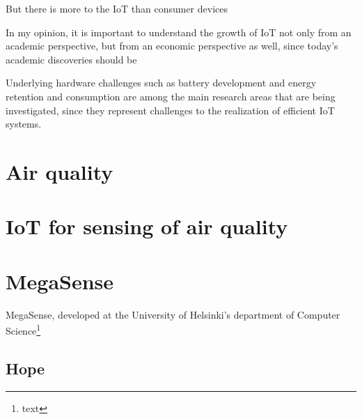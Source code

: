 		But there is more to the IoT than consumer devices
		
		In my opinion, it is important to understand the growth of IoT not only from an academic perspective, but from an economic perspective as well, since today's academic discoveries should be 
			
		Underlying hardware challenges such as battery development and energy retention and consumption are among the main research areas that are being investigated, since they represent challenges to the realization of efficient IoT systems.
		
		

\newpage
\section{Air quality}





\newpage
\section{IoT for sensing of air quality}

\newpage
\section{MegaSense}

	MegaSense, developed at the University of Helsinki's department of Computer Science\footnote{text}

	\subsection{Hope}